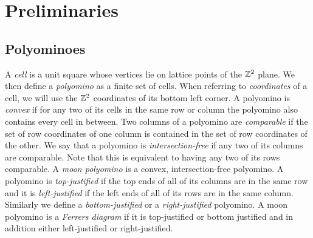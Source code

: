 \chapter{Preliminaries}

\section{Polyominoes}

A \emph{cell} is a unit square whose vertices lie on lattice points of the $\mathbb{Z}^2$ plane.
We then define a \emph{polyomino} as a finite set of cells. When referring to \emph{coordinates} of a cell,
we will use the $\mathbb{Z}^2$ coordinates of its bottom left corner.
A polyomino is \emph{convex} if for any two of its cells in the same row or column the polyomino also contains every cell in between.
Two columns of a polyomino are \emph{comparable} if the set of row coordinates of one column is contained in the set of row coordinates
of the other. We say that a polyomino is \emph{intersection-free} if any two of its columns are comparable. Note that this is equivalent
to having any two of its rows comparable. A \emph{moon polyomino} is a convex, intersection-free polyomino. A polyomino
is \emph{top-justified} if the top ends of all of its columns are in the same row and it is \emph{left-justified}
if the left ends of all of its rows are in the same column. Similarly we define a \emph{bottom-justified} or a
\emph{right-justified} polyomino.
A moon polyomino is a \emph{Ferrers diagram} if it is top-justified or bottom justified and in addition either left-justified or right-justified.

